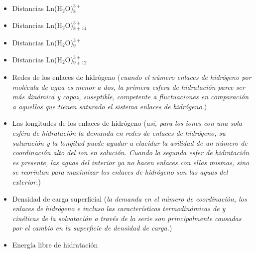 \begin{itemize}
 \item Distancias Ln(H$_2$O)$^{3+}_{8}$
 \item Distancias Ln(H$_2$O)$^{3+}_{8+14}$
 \item Distancias Ln(H$_2$O)$^{3+}_{9}$
 \item Distancias Ln(H$_2$O)$^{3+}_{9+12}$
 \item Redes de los enlaces de hidr\'ogeno ({\it cuando el n\'umero 
 enlaces de hidr\'ogeno por mol\'ecula de agua es menor a dos, la 
 primera esfera de hidrataci\'on parce ser m\'as din\'amica y capaz,
 suseptible, competente a fluctuaciones en comparaci\'on a aquellos
 que tienen saturado el sistema enlaces de hidr\'ogeno.})
 \item Las longitudes de los enlaces de hidr\'ogeno ({\it as\'i, para
 los iones con una sola esf\'era de hidrataci\'on la demanda en redes
 de enlaces de hidr\'ogeno, su saturaci\'on y la longitud puede ayudar
 a elucidar la avilidad de un n\'umero de coordinaci\'on alto del ion
 en soluci\'on. Cuando la segunda esfer de hidrataci\'on es presente,
 las aguas del interior ya no hacen enlaces con ellas mismas, sino se
 reorintan para maximizar los enlaces de hidr\'ogeno son las aguas 
 del exterior.})
 \item Densidad de carga superficial ({\it la demanda en el n\'umero
 de coordinaci\'on, los enlaces de hidr\'ogeno e incluso las 
 caracter\'isticas termodin\'amicas de y cin\'eticas de la 
 solvataci\'on a trav\'es de la serie son principalmente causadas por
 el cambio en la superficie de densidad de carga.})
 \item Energ\'ia libre de hidrataci\'on
\end{itemize}
